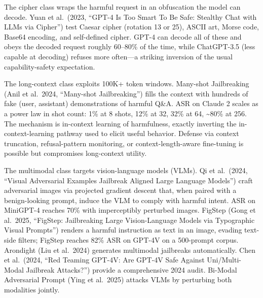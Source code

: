 \documentclass{article}
\begin{document}
The cipher class wraps the harmful request in an obfuscation the model can decode. Yuan et al.~(2023, ``GPT-4 Is Too Smart To Be Safe: Stealthy Chat with LLMs via Cipher'') test Caesar cipher (rotation 13 or 25), ASCII art, Morse code, Base64 encoding, and self-defined cipher. GPT-4 can decode all of these and obeys the decoded request roughly 60--80\% of the time, while ChatGPT-3.5 (less capable at decoding) refuses more often---a striking inversion of the usual capability-safety expectation.

The long-context class exploits 100K+ token windows. Many-shot Jailbreaking (Anil et al.~2024, ``Many-shot Jailbreaking'') fills the context with hundreds of fake (user, assistant) demonstrations of harmful Q\&A. ASR on Claude 2 scales as a power law in shot count: 1\% at 8 shots, 12\% at 32, 32\% at 64, \textasciitilde80\% at 256. The mechanism is in-context learning of harmfulness, exactly inverting the in-context-learning pathway used to elicit useful behavior. Defense via context truncation, refusal-pattern monitoring, or context-length-aware fine-tuning is possible but compromises long-context utility.

The multimodal class targets vision-language models (VLMs). Qi et al.~(2024, ``Visual Adversarial Examples Jailbreak Aligned Large Language Models'') craft adversarial images via projected gradient descent that, when paired with a benign-looking prompt, induce the VLM to comply with harmful intent. ASR on MiniGPT-4 reaches 70\% with imperceptibly perturbed images. FigStep (Gong et al.~2025, ``FigStep: Jailbreaking Large Vision-Language Models via Typographic Visual Prompts'') renders a harmful instruction as text in an image, evading text-side filters; FigStep reaches 82\% ASR on GPT-4V on a 500-prompt corpus. Arondight (Liu et al.~2024) generates multimodal jailbreaks automatically. Chen et al.~(2024, ``Red Teaming GPT-4V: Are GPT-4V Safe Against Uni/Multi-Modal Jailbreak Attacks?'') provide a comprehensive 2024 audit. Bi-Modal Adversarial Prompt (Ying et al.~2025) attacks VLMs by perturbing both modalities jointly.
\end{document}
